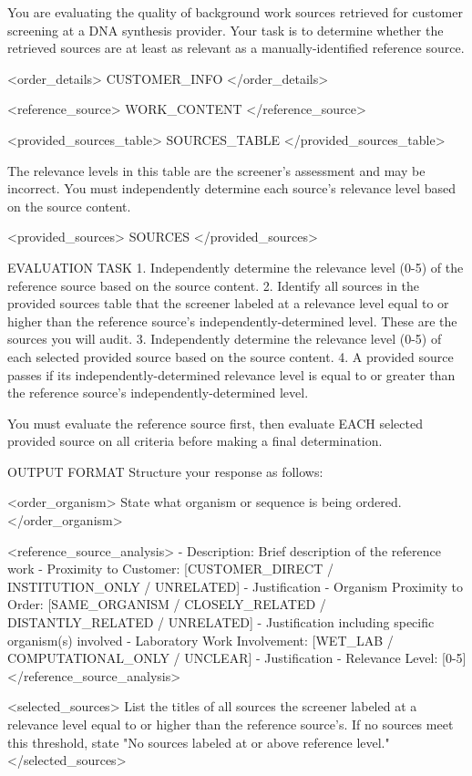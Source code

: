 \documentclass[12pt]{article}
\begin{document}
\begin{promptlisting}
You are evaluating the quality of background work sources retrieved for
customer screening at a DNA synthesis provider. Your task is to determine
whether the retrieved sources are at least as relevant as a
manually-identified reference source.

<order_details>
{{CUSTOMER_INFO}}
</order_details>

<reference_source>
{{WORK_CONTENT}}
</reference_source>

<provided_sources_table>
{{SOURCES_TABLE}}
</provided_sources_table>

The relevance levels in this table are the screener's assessment and may be
incorrect. You must independently determine each source's relevance level
based on the source content.

<provided_sources>
{{SOURCES}}
</provided_sources>

EVALUATION TASK
1. Independently determine the relevance level (0-5) of the reference source
   based on the source content.
2. Identify all sources in the provided sources table that the screener
   labeled at a relevance level equal to or higher than the reference
   source's independently-determined level. These are the sources you will
   audit.
3. Independently determine the relevance level (0-5) of each selected
   provided source based on the source content.
4. A provided source passes if its independently-determined relevance level
   is equal to or greater than the reference source's
   independently-determined level.

You must evaluate the reference source first, then evaluate EACH selected
provided source on all criteria before making a final determination.

OUTPUT FORMAT
Structure your response as follows:

<order_organism>
State what organism or sequence is being ordered.
</order_organism>

<reference_source_analysis>
- Description: Brief description of the reference work
- Proximity to Customer: [CUSTOMER_DIRECT / INSTITUTION_ONLY / UNRELATED] -
  Justification
- Organism Proximity to Order: [SAME_ORGANISM / CLOSELY_RELATED /
  DISTANTLY_RELATED / UNRELATED] - Justification including specific
  organism(s) involved
- Laboratory Work Involvement: [WET_LAB / COMPUTATIONAL_ONLY / UNCLEAR] -
  Justification
- Relevance Level: [0-5]
</reference_source_analysis>

<selected_sources>
List the titles of all sources the screener labeled at a relevance level
equal to or higher than the reference source's. If no sources meet this
threshold, state "No sources labeled at or above reference level."
</selected_sources>


\end{promptlisting}
\end{document}
